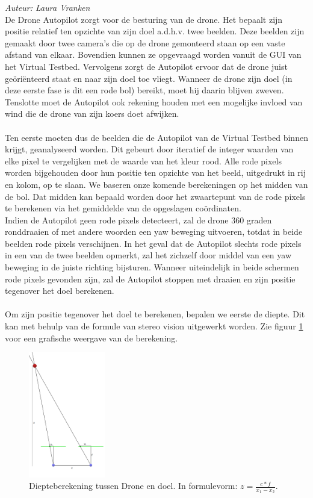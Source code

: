 {\em Auteur: Laura Vranken}\\

\noindent
De Drone Autopilot zorgt voor de besturing van de drone. Het bepaalt zijn positie relatief ten opzichte van zijn doel a.d.h.v. twee beelden. Deze beelden zijn gemaakt door twee camera's die op de drone gemonteerd staan op een vaste afstand van elkaar. Bovendien kunnen ze opgevraagd worden vanuit de GUI van het Virtual Testbed. Vervolgens zorgt de Autopilot ervoor dat de drone juist ge\"ori\"enteerd staat en naar zijn doel toe vliegt. Wanneer de drone zijn doel (in deze eerste fase is dit een rode bol) bereikt, moet hij daarin blijven zweven. Tenslotte moet de Autopilot ook rekening houden met een mogelijke invloed van wind die de drone van zijn koers doet afwijken.
\\
\\
Ten eerste moeten dus de beelden die de Autopilot van de Virtual Testbed binnen krijgt, geanalyseerd worden. Dit gebeurt door iteratief de integer waarden van elke pixel te vergelijken met de waarde van het kleur rood. Alle rode pixels worden bijgehouden door hun positie ten opzichte van het beeld, uitgedrukt in rij en kolom, op te slaan. We baseren onze komende berekeningen op het midden van de bol. Dat midden kan bepaald worden door het zwaartepunt van de rode pixels te berekenen via het gemiddelde van de opgeslagen co\"ordinaten.
\\
Indien de Autopilot geen rode pixels detecteert, zal de drone 360 graden ronddraaien of met andere woorden een yaw beweging uitvoeren, totdat in beide beelden rode pixels verschijnen. In het geval dat de Autopilot slechts rode pixels in een van de twee beelden opmerkt, zal het zichzelf door middel van een yaw beweging in de juiste richting bijsturen. Wanneer uiteindelijk in beide schermen rode pixels gevonden zijn, zal de Autopilot stoppen met draaien en zijn positie tegenover het doel berekenen.
\\
\\
Om zijn positie tegenover het doel te berekenen, bepalen we eerste de diepte. Dit kan met behulp van de formule van stereo vision \cite{website:techbriefs} uitgewerkt worden. Zie figuur \ref{fig:DiepteberekeningDroneEnDoel} voor een grafische weergave van de berekening.
\begin{figure}[h]
	\centering
	\includegraphics[width=0.3\textwidth]{DiepteberekeningDroneEnDoel.png}
	\caption{Diepteberekening tussen Drone en doel. In formulevorm: \(z = \frac{c * f}{x_1 - x_2}\).}
	\label{fig:DiepteberekeningDroneEnDoel}
\end{figure}
